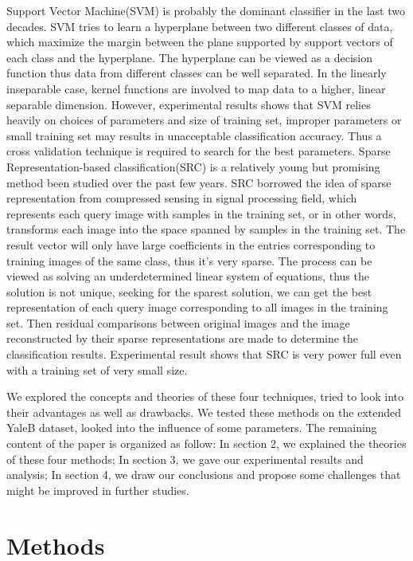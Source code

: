 \documentclass[conference]{IEEEtran}
\begin{document}
Support Vector Machine(SVM) is probably the dominant classifier in the last two decades. SVM tries to learn a hyperplane between two different classes of data, which maximize the margin between the plane supported by support vectors of each class and the hyperplane. The hyperplane can be viewed as a decision function thus data from different classes can be well separated. In the linearly inseparable case, kernel functions are involved to map data to a higher, linear separable dimension. However, experimental results shows that SVM relies heavily on choices of parameters and size of training set, improper parameters or small training set may results in unacceptable classification accuracy. Thus a cross validation technique is required to search for the best parameters. Sparse Representation-based classification(SRC) is a relatively young but promising method been studied over the past few years. SRC borrowed the idea of sparse representation from compressed sensing in signal processing field, which represents each query image with samples in the training set, or in other words, transforms each image into the space spanned by samples in the training set. The result vector will only have large coefficients in the entries corresponding to training images of the same class, thus it's very sparse. The process can be viewed as solving an underdetermined linear system of equations, thus the solution is not unique, seeking for the sparest solution, we can get the best representation of each query image corresponding to all images in the training set. Then residual comparisons between original images and the image reconstructed by their sparse representations are made to determine the classification results. Experimental result shows that SRC is very power full even with a training set of very small size.

We explored the concepts and theories of these four techniques, tried to look into their advantages as well as drawbacks. We tested these methods on the extended YaleB dataset, looked into the influence of some parameters. The remaining content of the paper is organized as follow: In section 2, we explained the theories of these four methods; In section 3, we gave our experimental results and analysis; In section 4, we draw our conclusions and propose some challenges that might be improved in further studies.


\section{Methods}
\end{document}

